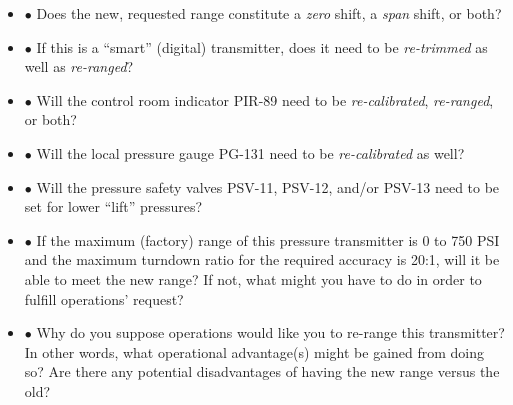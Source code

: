 \begin{itemize}
\item{$\bullet$} Does the new, requested range constitute a {\it zero} shift, a {\it span} shift, or both?
\vskip 10pt
\item{$\bullet$} If this is a ``smart'' (digital) transmitter, does it need to be {\it re-trimmed} as well as {\it re-ranged}?
\vskip 10pt
\item{$\bullet$} Will the control room indicator PIR-89 need to be {\it re-calibrated}, {\it re-ranged}, or both?
\vskip 10pt
\item{$\bullet$} Will the local pressure gauge PG-131 need to be {\it re-calibrated} as well?
\vskip 10pt
\item{$\bullet$} Will the pressure safety valves PSV-11, PSV-12, and/or PSV-13 need to be set for lower ``lift'' pressures?
\vskip 10pt
\item{$\bullet$} If the maximum (factory) range of this pressure transmitter is 0 to 750 PSI and the maximum turndown ratio for the required accuracy is 20:1, will it be able to meet the new range?  If not, what might you have to do in order to fulfill operations' request?
\vskip 10pt
\item{$\bullet$} Why do you suppose operations would like you to re-range this transmitter?  In other words, what operational advantage(s) might be gained from doing so?  Are there any potential disadvantages of having the new range versus the old?
\medskip















\end{itemize}
